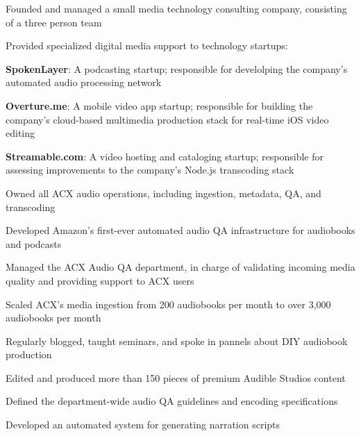 \documentclass[letterpaper]{deedy-resume} %
\begin{document}
\begin{minipage}[t]{0.66\textwidth}
\begin{tightitemize}
\item Founded and managed a small media technology consulting company, consisting of a three person team
\item Provided specialized digital media support to technology startups:
\item \textbf{SpokenLayer}: A podcasting startup; responsible for develolping the company's automated audio processing network
\item \textbf{Overture.me}: A mobile video app startup; responsible for building the company's cloud-based multimedia production stack for real-time iOS video editing
\item \textbf{Streamable.com}: A video hosting and cataloging startup; responsible for assessing improvements to the company's Node.js transcoding stack
\end{tightitemize}



\begin{tightitemize}
\item Owned all ACX audio operations, including ingestion, metadata, QA, and transcoding
\item Developed Amazon's first-ever automated audio QA infrastructure for audiobooks and podcasts
\item Managed the ACX Audio QA department, in charge of validating incoming media quality and providing support to ACX users
\item Scaled ACX's media ingestion from 200 audiobooks per month to over 3,000 audiobooks per month
\item Regularly blogged, taught seminars, and spoke in pannels about DIY audiobook production
\end{tightitemize}



\begin{tightitemize}
\item Edited and produced more than 150 pieces of premium Audible Studios content
\item Defined the department-wide audio QA guidelines and encoding specifications
\item Developed an automated system for generating narration scripts
\end{tightitemize}

\end{minipage} %
\end{document}
